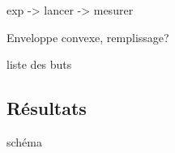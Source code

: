 \documentclass[french]{beamer}
\begin{document}
\begin{frame}
    
    exp -> lancer ->  mesurer

    
    Enveloppe convexe, remplissage?

    
    liste des buts





\end{frame}

\subsection{Résultats}

\begin{frame}
    schéma
\end{frame}

\end{document}
